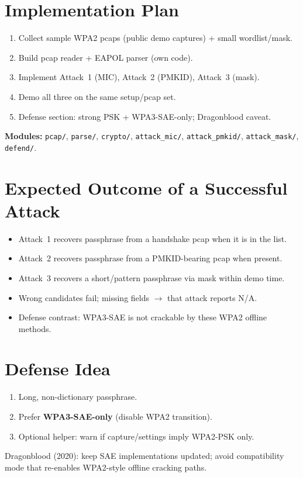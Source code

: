 \documentclass[11pt,a4paper]{article}
\begin{document}
\section{Implementation Plan}

\begin{enumerate}
  \item Collect sample WPA2 pcaps (public demo captures) + small wordlist/mask.
  \item Build pcap reader + EAPOL parser (own code).
  \item Implement Attack~1 (MIC), Attack~2 (PMKID), Attack~3 (mask).
  \item Demo all three on the same setup/pcap set.
  \item Defense section: strong PSK + WPA3-SAE-only; Dragonblood caveat.
\end{enumerate}

\noindent\textbf{Modules:} \texttt{pcap/}, \texttt{parse/}, \texttt{crypto/},
\texttt{attack\_mic/}, \texttt{attack\_pmkid/}, \texttt{attack\_mask/},
\texttt{defend/}.

\section{Expected Outcome of a Successful Attack}

\begin{itemize}
  \item Attack~1 recovers passphrase from a handshake pcap when it is in the list.
  \item Attack~2 recovers passphrase from a PMKID-bearing pcap when present.
  \item Attack~3 recovers a short/pattern passphrase via mask within demo time.
  \item Wrong candidates fail; missing fields $\rightarrow$ that attack reports N/A.
  \item Defense contrast: WPA3-SAE is not crackable by these WPA2 offline methods.
\end{itemize}

\section{Defense Idea}

\begin{enumerate}
  \item Long, non-dictionary passphrase.
  \item Prefer \textbf{WPA3-SAE-only} (disable WPA2 transition).
  \item Optional helper: warn if capture/settings imply WPA2-PSK only.
\end{enumerate}

\noindent Dragonblood (2020): keep SAE implementations updated; avoid compatibility
mode that re-enables WPA2-style offline cracking paths.
\end{document}
